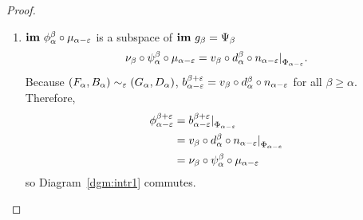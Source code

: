 \begin{proof}
  \begin{enumerate}[label=\Roman*.]
    \item $\mathbf{im}~\phi_\alpha^\beta\circ\mu_{\alpha-\varepsilon}$ is a subspace of $\mathbf{im}~g_\beta = \Psi_\beta$
      \[ \nu_\beta\circ\psi_\alpha^\beta\circ\mu_{\alpha-\varepsilon} = v_\beta\circ d_\alpha^\beta\circ n_{\alpha-\varepsilon}\mathord{\mid}_{\Phi_{\alpha-\varepsilon}}.\]
      Because $(F_\alpha, B_\alpha)\sim_\varepsilon (G_\alpha, D_\alpha)$, $b_{\alpha-\varepsilon}^{\beta+\varepsilon} = v_\beta\circ d_\alpha^\beta\circ n_{\alpha-\varepsilon}$ for all $\beta\geq \alpha$.
      Therefore,
      \begin{align*}
        \phi_{\alpha-\varepsilon}^{\beta+\varepsilon} &= b_{\alpha-\varepsilon}^{\beta+\varepsilon}\mathord{\mid}_{\Phi_{\alpha-\varepsilon}}\\
          &= v_\beta\circ d_\alpha^\beta\circ n_{\alpha-\varepsilon}\mathord{\mid}_{\Phi_{\alpha-e}}\\
          &= \nu_\beta\circ\psi_\alpha^\beta\circ\mu_{\alpha-\varepsilon}
      \end{align*}
      so Diagram~\ref{dgm:intr1} commutes.


\end{enumerate}
\end{proof}
